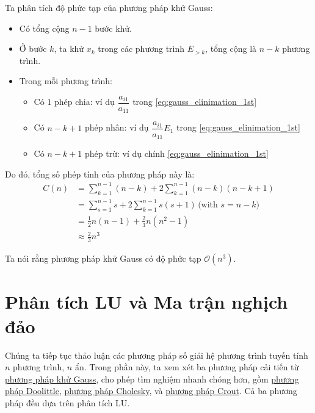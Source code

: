 \documentclass[../../Lectures]{subfiles}
\begin{document}
Ta phân tích độ phức tạp của phương pháp khử Gauss:
\begin{itemize}
    \item Có tổng cộng \(n - 1\) bước khử.

    \item Ở bước \(k\), ta khử \(x_k\) trong các phương trình \(E_{> k}\), tổng
        cộng là \(n - k\) phương trình.

    \item Trong mỗi phương trình:
        \begin{itemize}
            \item Có \(1\) phép chia: ví dụ \(\dfrac{a_{i1}}{a_{11}}\) trong
                \eqref{eq:gauss_elinimation_1st}

            \item Có \(n - k + 1\) phép nhân: ví dụ \(\dfrac{a_{i1}}{a_{11}}
                E_1\) trong \eqref{eq:gauss_elinimation_1st}

            \item Có \(n - k + 1\) phép trừ: ví dụ chính
                \eqref{eq:gauss_elinimation_1st}
        \end{itemize}
\end{itemize}

Do đó, tổng số phép tính của phương pháp này là:
\begin{align*}
    C(n) &= \sum_{k = 1}^{n - 1} (n - k) + 2 \sum_{k = 1}^{n - 1} (n - k)(n - k + 1) \\
         &= \sum_{s = 1}^{n - 1} s + 2 \sum_{k = 1}^{n - 1} s(s + 1) \, \text{(with \(s = n - k\))} \\
         &= \frac{1}{2} n(n - 1) + \frac{2}{3} n(n^2 - 1) \\
         &\approx \frac{2}{3} n^3
\end{align*}

Ta nói rằng phương pháp khử Gauss có độ phức tạp \(\mathcal{O} (n^3)\).



\section{Phân tích LU và Ma trận nghịch đảo}

Chúng ta tiếp tục thảo luận các phương pháp số giải hệ phương trình tuyến tính
\(n\) phương trình, \(n\) ẩn. Trong phần này, ta xem xét ba phương pháp cải tiến
từ \hyperref[method:gauss_elimination]{phương pháp khử Gauss}, cho phép tìm
nghiệm nhanh chóng hơn, gồm \hyperref[thm:doolittle]{phương pháp Doolittle},
\hyperref[method:cholesky]{phương pháp Cholesky}, và
\hyperref[method:crout]{phương pháp Crout}. Cả ba phương pháp đều dựa trên phân
tích LU.
\end{document}
